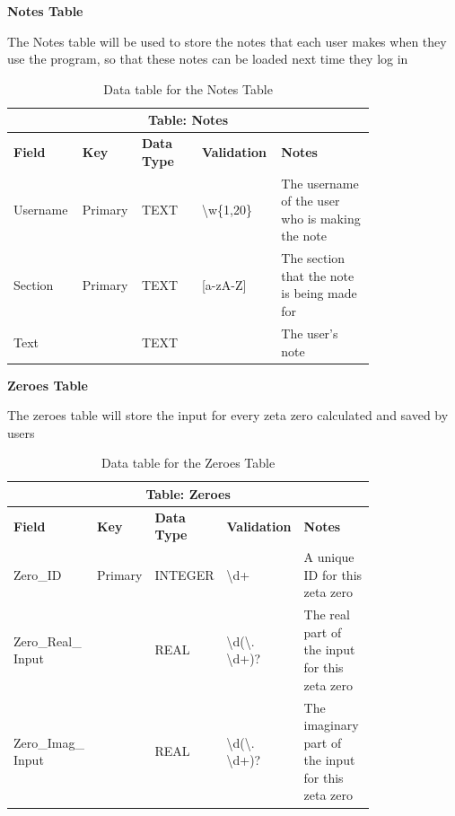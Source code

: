 \documentclass{article}
\begin{document}
\clearpage
\textbf{Notes Table}

The Notes table will be used to store the notes that each user makes when they use the program, so that these notes can be loaded next time they log in

\begin{table}[ht]
    \centering
    \begin{tabular}{ | p{0.15\linewidth} | p{0.1\linewidth} | p{0.16\linewidth} | p{0.14\linewidth} | p{0.25\linewidth} | }
    \hline
    \multicolumn{5}{|c|}{\textbf{Table: Notes}}\\
    \hline
    \hline
    \textbf{Field} & \textbf{Key} & \textbf{Data Type} & \textbf{Validation} & \textbf{Notes} \\
    \hline
    Username & Primary & TEXT & \textbackslash w\{1,20\} & The username of the user who is making the note\\
    \hline
    Section & Primary & TEXT & [a-zA-Z] & The section that the note is being made for\\
    \hline
    Text & & TEXT & & The user's note\\
    \hline
    \end{tabular}
    \caption{Data table for the Notes Table}
\end{table}

\textbf{Zeroes Table}

The zeroes table will store the input for every zeta zero calculated and saved by users

\begin{table}[ht]
    \centering
    \begin{tabular}{ | p{0.15\linewidth} | p{0.1\linewidth} | p{0.16\linewidth} | p{0.14\linewidth} | p{0.25\linewidth} | }
    \hline
    \multicolumn{5}{|c|}{\textbf{Table: Zeroes}}\\
    \hline
    \hline
    \textbf{Field} & \textbf{Key} & \textbf{Data Type} & \textbf{Validation} & \textbf{Notes} \\
    \hline
    Zero\_ID & Primary & INTEGER & \textbackslash d+ & A unique ID for this zeta zero\\
    \hline
    Zero\_Real\_ Input & & REAL & \textbackslash d(\textbackslash. \textbackslash d+)? & The real part of the input for this zeta zero\\
    \hline
    Zero\_Imag\_ Input & & REAL & \textbackslash d(\textbackslash. \textbackslash d+)? & The imaginary part of the input for this zeta zero\\
    \hline
    \end{tabular}
    \caption{Data table for the Zeroes Table}
\end{table}
\end{document}
